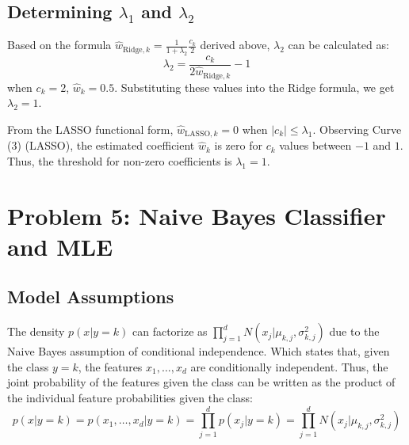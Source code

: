 \documentclass[11pt, a4paper, oneside]{memoir}
\begin{document}
\section[Determining lambda1 and lambda2]{Determining $\lambda_1$ and $\lambda_2$}
Based on the formula $\hat{w}_{\text{Ridge},k} = \frac{1}{1 + \lambda_2} \frac{c_k}{2}$ derived above, $\lambda_2$ can be calculated as:
\[ \lambda_2 = \frac{c_k}{2 \hat{w}_{\text{Ridge},k}} - 1 \]
when $c_k = 2$, $\hat{w}_k = 0.5$. Substituting these values into the Ridge formula, we get $\lambda_2 = 1$.

From the LASSO functional form, $\hat{w}_{\text{LASSO},k} = 0$ when $|c_k| \le \lambda_1$.
Observing Curve (3) (LASSO), the estimated coefficient $\hat{w}_k$ is zero for $c_k$ values between $-1$ and $1$.
Thus, the threshold for non-zero coefficients is $\lambda_1 = 1$.

\chapter{Problem 5: Naive Bayes Classifier and MLE}
\section{Model Assumptions}
The density $p(x | y = k)$ can factorize as $\prod_{j=1}^{d} N(x_j | \mu_{k,j}, \sigma^2_{k,j})$ due to the Naive Bayes assumption of conditional independence.
Which states that, given the class $y=k$, the features $x_1, \dots, x_d$ are conditionally independent.
Thus, the joint probability of the features given the class can be written as the product of the individual feature probabilities given the class:
\[ p(x | y = k) = p(x_1, \dots, x_d | y = k) = \prod_{j=1}^{d} p(x_j | y = k) = \prod_{j=1}^{d} N(x_j | \mu_{k,j}, \sigma^2_{k,j}) \]
\end{document}
